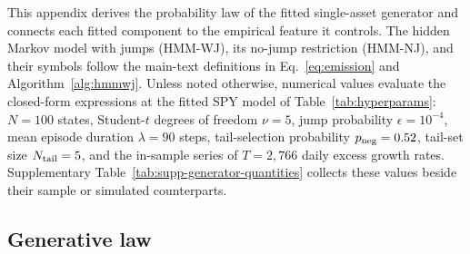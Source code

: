 This appendix derives the probability law of the fitted single-asset
generator and connects each fitted component to the empirical feature
it controls. The hidden Markov model with jumps (HMM-WJ), its no-jump
restriction (HMM-NJ), and their symbols follow the main-text
definitions in Eq.~\eqref{eq:emission} and
Algorithm~\ref{alg:hmmwj}. Unless noted otherwise, numerical values
evaluate the closed-form expressions at the fitted SPY model of
Table~\ref{tab:hyperparams}: $N = 100$ states, Student-$t$ degrees of
freedom $\nu = 5$, jump probability $\epsilon = 10^{-4}$, mean episode
duration $\lambda = 90$ steps, tail-selection probability
$p_{\rm neg} = 0.52$, tail-set size $N_{\rm tail} = 5$, and the
in-sample series of $T = 2{,}766$ daily excess growth rates.
Supplementary Table~\ref{tab:supp-generator-quantities} collects these values
beside their sample or simulated counterparts.

\begin{table}[H]
\centering
\caption{\textbf{Closed-form quantities of the fitted SPY generator
    against sample and simulated values.} Each closed-form entry
    evaluates the expression named in the text at the fitted SPY
    model of Table~\ref{tab:hyperparams}. Sample values are computed
    from the in-sample SPY series; simulated values use $400$
    in-sample-length paths for the jump-episode quantities and
    $1{,}000$ paths for skewness. For comparison with the
    sup-distance entry, the two-sample Kolmogorov--Smirnov critical
    value at $\alpha = 0.05$ for two samples of $T = 2{,}766$
    observations is $1.358\sqrt{2/T} = 0.0365$. Observed
    autocorrelations are those of the in-sample series shown in
    Fig.~\ref{fig:empirical_motivation}d.}
\label{tab:supp-generator-quantities}
\footnotesize
\resizebox{\textwidth}{!}{}
\end{table}

\subsection{Generative law}
\label{sec:supp-gen-law}


